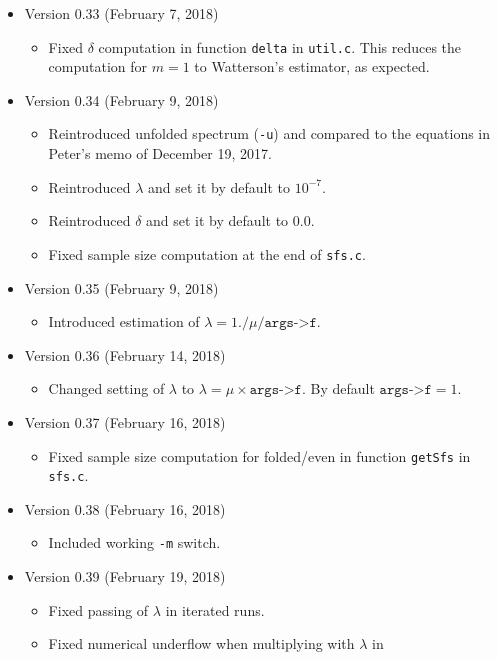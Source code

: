 \documentclass[a4paper, english]{article}
\newcommand{\ty}{\texttt}
\begin{document}
\begin{itemize}
\item Version 0.33 (February 7, 2018)
  \begin{itemize}
    \item Fixed $\delta$ computation in function \ty{delta} in
      \ty{util.c}. This reduces the computation for $m=1$ to
      Watterson's estimator, as expected.
  \end{itemize}
\item Version 0.34 (February 9, 2018)
  \begin{itemize}
    \item Reintroduced unfolded spectrum (\ty{-u}) and compared to the equations
      in Peter's memo of December 19, 2017.
    \item Reintroduced $\lambda$ and set it by default to $10^{-7}$.
    \item Reintroduced $\delta$ and set it by default to $0.0$.
    \item Fixed sample size computation at the end of \ty{sfs.c}.
  \end{itemize}
\item Version 0.35 (February 9, 2018)
  \begin{itemize}
  \item Introduced estimation of $\lambda=1./\mu/\texttt{args->f}$.
  \end{itemize}
\item Version 0.36 (February 14, 2018)
  \begin{itemize}
    \item Changed setting of $\lambda$ to
      $\lambda=\mu\times\texttt{args->f}$. By default
      $\texttt{args->f}=1$.
  \end{itemize}
\item Version 0.37 (February 16, 2018)
  \begin{itemize}
    \item Fixed sample size computation for folded/even in function
      \ty{getSfs} in \ty{sfs.c}.
  \end{itemize}
\item Version 0.38 (February 16, 2018)
  \begin{itemize}
  \item Included working \ty{-m} switch.
  \end{itemize}
\item Version 0.39 (February 19, 2018)
  \begin{itemize}
  \item Fixed passing of $\lambda$ in iterated runs.
  \item Fixed numerical underflow when multiplying with $\lambda$ in

\end{itemize}
\end{itemize}
\end{document}
